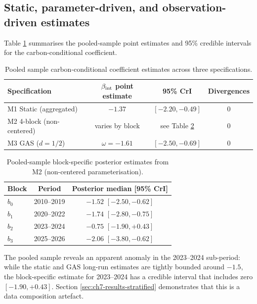 \label{sec:ch7-results-pooled}

\subsection{Static, parameter-driven, and observation-driven estimates}

Table \ref{tab:ch7-pooled} summarises the pooled-sample point estimates and 95\% credible intervals for the carbon-conditional coefficient.

\begin{table}[h!]
\centering
\caption{Pooled sample carbon-conditional coefficient estimates across three specifications.}
\begin{tabular}{lccc}
\toprule
Specification & $\beta_{\mathrm{int}}$ point estimate & 95\% CrI & Divergences \\
\midrule
M1 Static (aggregated) & $-1.37$ & $[-2.20, -0.49]$ & 0 \\
M2 4-block (non-centered) & varies by block & see Table \ref{tab:ch7-blocks-pooled} & 0 \\
M3 GAS ($d = 1/2$) & $\omega = -1.61$ & $[-2.50, -0.69]$ & 0 \\
\bottomrule
\end{tabular}
\label{tab:ch7-pooled}
\end{table}

\begin{table}[h!]
\centering
\caption{Pooled-sample block-specific posterior estimates from M2 (non-centered parameterisation).}
\begin{tabular}{lcc}
\toprule
Block & Period & Posterior median [95\% CrI] \\
\midrule
$b_0$ & 2010--2019 & $-1.52$ $[-2.50, -0.62]$ \\
$b_1$ & 2020--2022 & $-1.74$ $[-2.80, -0.75]$ \\
$b_2$ & 2023--2024 & $-0.75$ $[-1.90, +0.43]$ \\
$b_3$ & 2025--2026 & $-2.06$ $[-3.80, -0.62]$ \\
\bottomrule
\end{tabular}
\label{tab:ch7-blocks-pooled}
\end{table}

The pooled sample reveals an apparent anomaly in the 2023--2024 sub-period: while the static and GAS long-run estimates are tightly bounded around $-1.5$, the block-specific estimate for 2023--2024 has a credible interval that includes zero $[-1.90, +0.43]$. Section \ref{sec:ch7-results-stratified} demonstrates that this is a data composition artefact.


